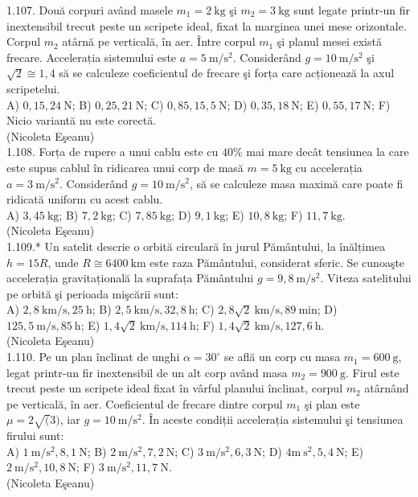 1.107. Două corpuri având masele $m_{1}=2 \mathrm{~kg}$ şi $m_{2}=3 \mathrm{~kg}$ sunt legate printr-un fir inextensibil trecut peste un scripete ideal, fixat la marginea unei mese orizontale. Corpul $m_{2}$ atârnă pe verticală, în aer. Între corpul $m_{1}$ şi planul mesei există frecare. Accelerația sistemului este $a=5 \mathrm{~m} / \mathrm{s}^{2}$. Considerând $g=10 \mathrm{~m} / \mathrm{s}^{2}$ şi $\sqrt{2} \cong 1,4$ să se calculeze coeficientul de frecare şi forța care acționează la axul scripetelui.\\ A) $0,15, 24 \mathrm{~N}$; B) $0,25, 21 \mathrm{~N}$; C) $0,85, 15,5 \mathrm{~N}$; D) $0,35, 18 \mathrm{~N}$; E) $0,55, 17 \mathrm{~N}$; F) Nicio variantă nu este corectă.\\ (Nicoleta Eşeanu)\\

1.108. Forța de rupere a unui cablu este cu $40 \%$ mai mare decât tensiunea la care este supus cablul în ridicarea unui corp de masă $m=5 \mathrm{~kg}$ cu accelerația $a=3 \mathrm{~m} / \mathrm{s}^{2}$. Considerând $g=10 \mathrm{~m} / \mathrm{s}^{2}$, să se calculeze masa maximă care poate fi ridicată uniform cu acest cablu.\\ A) $3,45 \mathrm{~kg}$; B) $7,2 \mathrm{~kg}$; C) $7,85 \mathrm{~kg}$; D) $9,1 \mathrm{~kg}$; E) $10,8 \mathrm{~kg}$; F) $11,7 \mathrm{~kg}$.\\ (Nicoleta Eşeanu)\\

1.109.* Un satelit descrie o orbită circulară în jurul Pământului, la înălțimea $h=15 R$, unde $R \cong 6400 \mathrm{~km}$ este raza Pământului, considerat sferic. Se cunoaşte accelerația gravitațională la suprafața Pământului $g=9,8 \mathrm{~m} / \mathrm{s}^{2}$. Viteza satelitului pe orbită şi perioada mişcării sunt:\\ A) $2,8 \mathrm{~km} / \mathrm{s}, 25 \mathrm{~h}$; B) $2,5 \mathrm{~km} / \mathrm{s}, 32,8 \mathrm{~h}$; C) $2,8 \sqrt{2} \mathrm{~km} / \mathrm{s}, 89 \mathrm{~min}$; D) $125,5 \mathrm{~m} / \mathrm{s}, 85 \mathrm{~h}$; E) $1,4 \sqrt{2} \mathrm{~km} / \mathrm{s}, 114 \mathrm{~h}$; F) $1,4 \sqrt{2} \mathrm{~km} / \mathrm{s}, 127,6 \mathrm{~h}$.\\ (Nicoleta Eşeanu)\\

1.110. Pe un plan înclinat de unghi $\alpha=30^{\circ}$ se află un corp cu masa $m_{1}=600 \mathrm{~g}$, legat printr-un fir inextensibil de un alt corp având masa $m_{2}=900 \mathrm{~g}$. Firul este trecut peste un scripete ideal fixat în vârful planului înclinat, corpul $m_{2}$ atârnând pe verticală, în aer. Coeficientul de frecare dintre corpul $m_{1}$ şi plan este $\mu=2 \sqrt(3)$, iar $g=10 \mathrm{~m} / \mathrm{s}^{2}$. În aceste condiții accelerația sistemului şi tensiunea firului sunt:\\ A) $1 \mathrm{~m} / \mathrm{s}^{2}, 8,1 \mathrm{~N}$; B) $2 \mathrm{~m} / \mathrm{s}^{2}, 7,2 \mathrm{~N}$; C) $3 \mathrm{~m} / \mathrm{s}^{2}, 6,3 \mathrm{~N}$; D) $4 \mathrm{m} \mathrm{~s}^{2}, 5,4 \mathrm{~N}$; E) $2 \mathrm{~m} / \mathrm{s}^{2}, 10,8 \mathrm{~N}$; F) $3 \mathrm{~m} / \mathrm{s}^{2}, 11,7 \mathrm{~N}$. \\ (Nicoleta Eşeanu)\\


